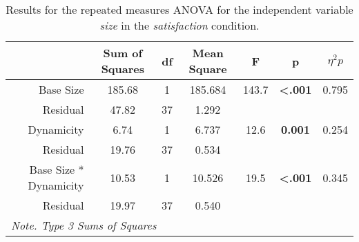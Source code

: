 \begin{table*}[ht]
    \centering
    \caption{Results for the repeated measures ANOVA for the independent variable \textit{size} in the \textit{satisfaction} condition.}
    \begin{tabular}{r|cccccc}
    \toprule
                                  & \textbf{Sum of Squares} & \textbf{df} & \textbf{Mean Square} & \textbf{F} & \textbf{p} & \textbf{$\eta^2p$} \\
    \midrule
    Base Size                     & 185.68                  & 1           & 185.684             & 143.7       & \textbf{<.001}      & 0.795              \\
    Residual                      & 47.82                   & 37          & 1.292               &             &            &                    \\
    Dynamicity                    & 6.74                    & 1           & 6.737               & 12.6        & \textbf{0.001}      & 0.254              \\
    Residual                      & 19.76                   & 37          & 0.534               &             &            &                    \\
    Base Size * Dynamicity        & 10.53                   & 1           & 10.526              & 19.5        & \textbf{<.001}      & 0.345              \\
    Residual                      & 19.97                   & 37          & 0.540               &             &            &                    \\
    \bottomrule
    \multicolumn{7}{l}{\textit{Note. Type 3 Sums of Squares}}                                                                                                                                                                                                  
    \end{tabular}
\end{table*}

